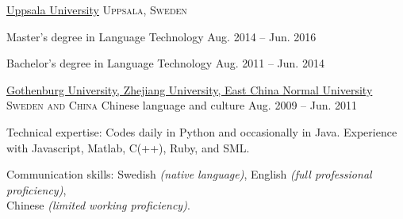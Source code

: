 \documentclass[10pt,a4paper]{article}
\begin{document}
\headedsection
  {\href{http://www.uu.se/en/}{Uppsala University}}
  {\textsc{Uppsala, Sweden}} {%
  
  \headedsubsection
    {Master's degree in Language Technology}
    {Aug. 2014 -- Jun. 2016}
    {}
  
  \headedsubsection
    {Bachelor's degree in Language Technology}
    {Aug. 2011 -- Jun. 2014}
    {}
    
}

\headedsection
  {\href{http://gu.se/english/}{Gothenburg University, Zhejiang University, East China Normal University}}
  {\textsc{Sweden and China}} {%
  \headedsubsection
    {Chinese language and culture}
    {Aug. 2009 -- Jun. 2011} {}
}

\spacedhrule{0.5em}{-0.4em}


\inlineheadsection  %
  {Technical expertise:}
  {Codes daily in Python and occasionally in Java. Experience with Javascript, Matlab, C(++), Ruby, and SML.}

\vspace{0.5em}
\inlineheadsection
  {Communication skills:}
  {Swedish \emph{(native language)}, English \emph{(full professional proficiency)}, \\Chinese \emph{(limited working proficiency)}.}
\end{document}
